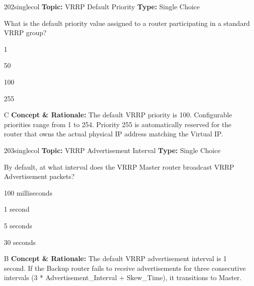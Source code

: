 \begin{qcard}{202}{singlecol}
\textcolor{darkslate!75}{\small\textbf{Topic:} VRRP Default Priority \hfill \textbf{Type:} Single Choice}\vspace{0.4em}\par
What is the default priority value assigned to a router participating in a standard VRRP group?
\begin{qoptions}
\item 1
\item 50
\item 100
\item 255
\end{qoptions}
\end{qcard}
\nopagebreak
\begin{explainbox}{C}
\textbf{Concept \& Rationale:} The default VRRP priority is 100. Configurable priorities range from 1 to 254. Priority 255 is automatically reserved for the router that owns the actual physical IP address matching the Virtual IP.
\end{explainbox}

\begin{qcard}{203}{singlecol}
\textcolor{darkslate!75}{\small\textbf{Topic:} VRRP Advertisement Interval \hfill \textbf{Type:} Single Choice}\vspace{0.4em}\par
By default, at what interval does the VRRP Master router broadcast VRRP Advertisement packets?
\begin{qoptions}
\item 100 milliseconds
\item 1 second
\item 5 seconds
\item 30 seconds
\end{qoptions}
\end{qcard}
\nopagebreak
\begin{explainbox}{B}
\textbf{Concept \& Rationale:} The default VRRP advertisement interval is 1 second. If the Backup router fails to receive advertisements for three consecutive intervals (3 * Advertisement\_Interval + Skew\_Time), it transitions to Master.
\end{explainbox}

